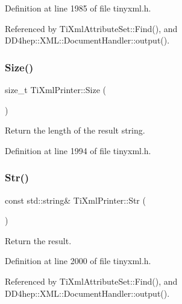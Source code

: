 Definition at line 1985 of file tinyxml.\+h.



Referenced by Ti\+Xml\+Attribute\+Set\+::\+Find(), and D\+D4hep\+::\+X\+M\+L\+::\+Document\+Handler\+::output().

\hypertarget{class_ti_xml_printer_ad01375ae9199bd2f48252eaddce3039d}{}\label{class_ti_xml_printer_ad01375ae9199bd2f48252eaddce3039d} 
\subsubsection{\texorpdfstring{Size()}{Size()}}
{\footnotesize\ttfamily size\+\_\+t Ti\+Xml\+Printer\+::\+Size (\begin{DoxyParamCaption}{ }\end{DoxyParamCaption})\hspace{0.3cm}{\ttfamily [inline]}}



Return the length of the result string. 



Definition at line 1994 of file tinyxml.\+h.

\hypertarget{class_ti_xml_printer_a3bd4daf44309b41f5813a833caa0d1c9}{}\label{class_ti_xml_printer_a3bd4daf44309b41f5813a833caa0d1c9} 
\subsubsection{\texorpdfstring{Str()}{Str()}}
{\footnotesize\ttfamily const std\+::string\& Ti\+Xml\+Printer\+::\+Str (\begin{DoxyParamCaption}{ }\end{DoxyParamCaption})\hspace{0.3cm}{\ttfamily [inline]}}



Return the result. 



Definition at line 2000 of file tinyxml.\+h.



Referenced by Ti\+Xml\+Attribute\+Set\+::\+Find(), and D\+D4hep\+::\+X\+M\+L\+::\+Document\+Handler\+::output().

\hypertarget{class_ti_xml_printer_adaf7eec4dc43ad071ff52b60361574f5}{}\label{class_ti_xml_printer_adaf7eec4dc43ad071ff52b60361574f5} 
